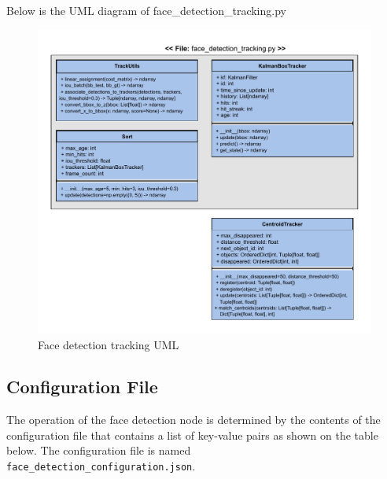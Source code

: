\documentclass{CSSRforAfrica}
\begin{document}
{\newpage

Below is the UML diagram of face\_detection\_tracking.py

\begin{figure}[!hbpt]
	\centering
	\includegraphics[scale=0.90]{images/Face_Tracking_UML.pdf}
	\caption{Face detection tracking UML}
	\label{fig: Face detection tracking UML}
\end{figure}

\newpage

\subsection*{Configuration File}
The operation of the face detection node is determined by the contents of the configuration file that contains a list of key-value pairs as shown on the table below. 
The configuration file is named  \\
\texttt{face\_detection\_configuration.json}. 

}
\end{document}

